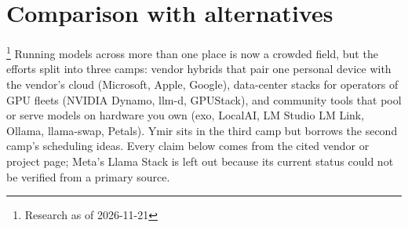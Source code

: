 \section{Comparison with alternatives}\label{sec:comparison}

\footnote{Research as of 2026-11-21}
Running models across more than one place is now a crowded field, but
the efforts split into three camps: vendor hybrids that pair one personal device with the vendor's
cloud (Microsoft, Apple, Google), data-center stacks for operators of GPU fleets (NVIDIA Dynamo,
llm-d, GPUStack), and community tools that pool or serve models on hardware you own (exo, LocalAI,
LM Studio LM Link, Ollama, llama-swap, Petals). Ymir sits in the third camp but borrows the second
camp's scheduling ideas. Every claim below comes from the cited vendor or project page; Meta's
Llama Stack is left out because its current status could not be verified from a primary source.

